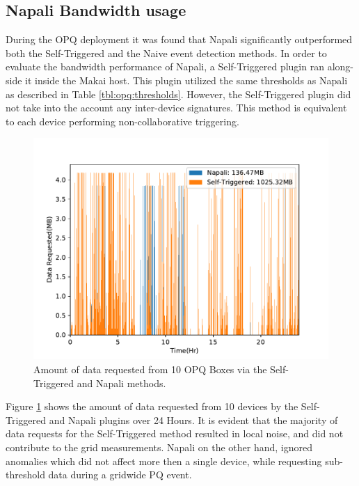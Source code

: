 \subsection{Napali Bandwidth usage}\label{subsec:napali-bandwidth-usage}
During the OPQ deployment it was found that Napali significantly outperformed both the Self-Triggered and the Naive event detection methods.
In order to evaluate the bandwidth performance of Napali, a Self-Triggered plugin ran along-side it inside the Makai host.
This plugin utilized the same thresholds as Napali as described in Table \ref{tbl:opq:thresholds}.
However, the Self-Triggered plugin did not take into the account any inter-device signatures.
This method is equivalent to each device performing non-collaborative triggering.
\begin{figure}[ht!]
    \centering
    \includegraphics[width=0.8\linewidth]{img/napali_eval/napali_request_bandwidth.pdf}
    \caption{Amount of data requested from 10 OPQ Boxes via the Self-Triggered and Napali methods.}
    \label{expdes:fig:self_triggered_bandwidth}
\end{figure}

Figure \ref{expdes:fig:self_triggered_bandwidth} shows the amount of data requested from 10 devices by the Self-Triggered and Napali plugins over 24 Hours.
It is evident that the majority of data requests for the Self-Triggered method resulted in local noise, and did not contribute to the grid measurements.
Napali on the other hand, ignored anomalies which did not affect more then a single device, while requesting sub-threshold data during a gridwide PQ event.

